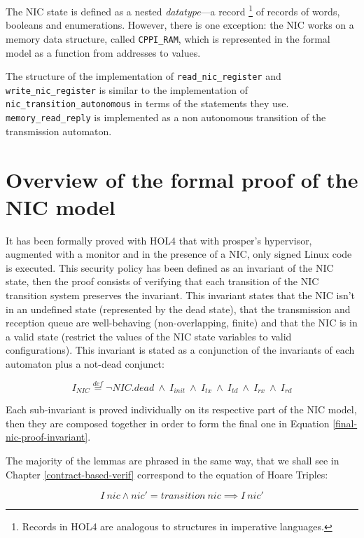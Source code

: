 \documentclass{kththesis}
\newcommand{\eqdef}{\stackrel{def}{=}}
\begin{document}
{The NIC state is defined as a nested \textit{datatype}---a record \footnote{Records in HOL4 are analogous to structures in imperative languages.} of records of words, booleans and enumerations. However, there is one exception: the NIC works on a memory data structure, called \texttt{CPPI\_RAM}, which is represented in the formal model as a function from addresses to values.

The structure of the implementation of \texttt{read\_nic\_register} and \texttt{write\_nic\_register} is similar to the implementation of \texttt{nic\_transition\_autonomous} in terms of the statements they use. \texttt{memory\_read\_reply} is implemented as a non autonomous transition of the transmission automaton.

\section{Overview of the formal proof of the NIC model} \label{overview-nic-proof}

It has been formally proved with HOL4 that with \gls{prosper}'s hypervisor, augmented with a monitor and in the presence of a \gls{NIC}, only signed Linux code is executed. This security policy has been defined as an invariant of the NIC state, then the proof consists of verifying that each transition of the NIC transition system preserves the invariant. This invariant states that the NIC isn't in an undefined state (represented by the dead state), that the transmission and reception queue are well-behaving (non-overlapping, finite) and that the NIC is in a valid state (restrict the values of the NIC state variables to valid configurations). This invariant is stated as a conjunction of the invariants of each automaton plus a not-dead conjunct:

\begin{equation}
    I_{NIC} \eqdef \neg NIC.dead~\land~I_{init}~\land~I_{tx}~\land~I_{td}~\land~I_{rx}~\land~I_{rd}
    \label{final-nic-proof-invariant}
\end{equation}

Each sub-invariant is proved individually on its respective part of the NIC model, then they are composed together in order to form the final one in Equation \ref{final-nic-proof-invariant}.

The majority of the lemmas are phrased in the same way, that we shall see in Chapter \ref{contract-based-verif} correspond to the equation of Hoare Triples:

\begin{equation}
  I~nic \land nic' = transition~nic \implies I~nic'
  \label{nic-typical-lemma}
\end{equation}

}
\end{document}
